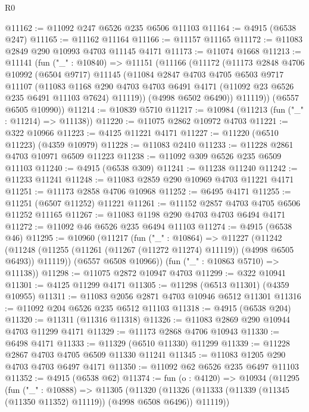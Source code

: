 \begin{lexlean}{R0}
\begin{coremodule}
@11162 := @11092 @247 @6526 @235 @6506 @11103
@11164 := @4915 (@6538 @247)
@11165 := @11162 @11164
@11166 := @11157 @11165
@11172 := @11083 @2849 @290 @10993 @4703 @11145 @4171
@11173 := @11074 @1668
@11213 := @11141
    (fun ("_" : @10840) =>
    @11151
      (@11166
        (@11172
          (@11173
            @2848
            @4706
            @10992
            (@6504 @9717)
            @11145
            (@11084
              @2847
              @4703
              @4705
              @6503
              @9717
              @11107
              (@11083
                @1168
                @290
                @4703
                @4703
                @6491
                @4171
                (@11092 @23 @6526 @235 @6491 @11103 @7624)
                @11119))
            (@4998 @6502 @6490))
          @11119))
      (@6557 @6505 @10990))
@11214 := @10839 @5710
@11217 := @10984 (@11213 (fun ("_" : @11214) => @11138))
@11220 := @11075 @2862 @10972 @4703
@11221 := @322 @10966
@11223 := @4125 @11221 @4171
@11227 := @11220 (@6510 @11223) (@4359 @10979)
@11228 := @11083 @2410
@11233 := @11228 @2861 @4703 @10971 @6509 @11223
@11238 := @11092 @309 @6526 @235 @6509 @11103
@11240 := @4915 (@6538 @309)
@11241 := @11238 @11240
@11242 := @11233 @11241
@11248 := @11083 @2859 @290 @10969 @4703 @11221 @4171
@11251 := @11173 @2858 @4706 @10968
@11252 := @6495 @4171
@11255 := @11251 (@6507 @11252) @11221
@11261 := @11152 @2857 @4703 @4705 @6506 @11252 @11165
@11267 := @11083 @1198 @290 @4703 @4703 @6494 @4171
@11272 := @11092 @46 @6526 @235 @6494 @11103
@11274 := @4915 (@6538 @46)
@11295 := @10960
    (@11217
      (fun ("_" : @10864) =>
      @11227
        (@11242
          (@11248 (@11255 (@11261 (@11267 (@11272 @11274) @11119)) (@4998 @6505 @6493)) @11119))
        (@6557 @6508 @10966))
      (fun ("_" : @10863 @5710) => @11138))
@11298 := @11075 @2872 @10947 @4703
@11299 := @322 @10941
@11301 := @4125 @11299 @4171
@11305 := @11298 (@6513 @11301) (@4359 @10955)
@11311 := @11083 @2056 @2871 @4703 @10946 @6512 @11301
@11316 := @11092 @204 @6526 @235 @6512 @11103
@11318 := @4915 (@6538 @204)
@11320 := @11311 (@11316 @11318)
@11326 := @11083 @2869 @290 @10944 @4703 @11299 @4171
@11329 := @11173 @2868 @4706 @10943
@11330 := @6498 @4171
@11333 := @11329 (@6510 @11330) @11299
@11339 := @11228 @2867 @4703 @4705 @6509 @11330 @11241
@11345 := @11083 @1205 @290 @4703 @4703 @6497 @4171
@11350 := @11092 @62 @6526 @235 @6497 @11103
@11352 := @4915 (@6538 @62)
@11374 := fun (o : @4120) =>
  @10934
    (@11295
      (fun ("_" : @10888) =>
      @11305
        (@11320
          (@11326 (@11333 (@11339 (@11345 (@11350 @11352) @11119)) (@4998 @6508 @6496)) @11119))

\end{coremodule}
\end{lexlean}

